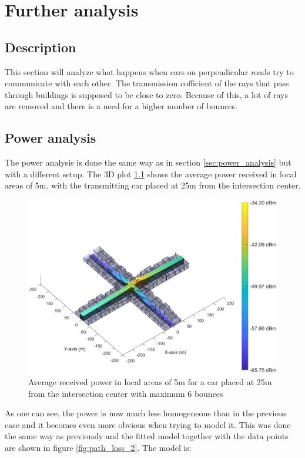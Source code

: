 \documentclass[10pt,a4paper]{ULBreport}
\begin{document}
\chapter{Further analysis}
\section{Description}
This section will analyze what happens when cars on perpendicular roads try to communicate with each other. The transmission cofficient of the rays that pass through buildings is supposed to be close to zero. Because of this, a lot of rays are removed and there is a need for a higher number of bounces. \\
\section{Power analysis}
The power analysis is done the same way as in section \ref{sec:power_analysis} but with a different setup. The 3D plot \ref{fig:3D_2} shows the average power received in local areas of 5m. with the transmitting car placed at 25m from the intersection center.

\begin{figure}
    \centering
    \includegraphics[width=1\textwidth]{6_1.eps}
    \caption{Average received power in local areas of 5m for a car placed at 25m from the intersection center with maximum 6 bounces}
    \label{fig:3D_2}
\end{figure}


As one can see, the power is now much less homogeneous than in the previous case and it becomes even more obvious when trying to model it. This was done the same way as previously and the fitted model together with the data points are shown in figure \ref{fig:path_loss_2}. The model is:
\vspace{-1cm}
\end{document}
